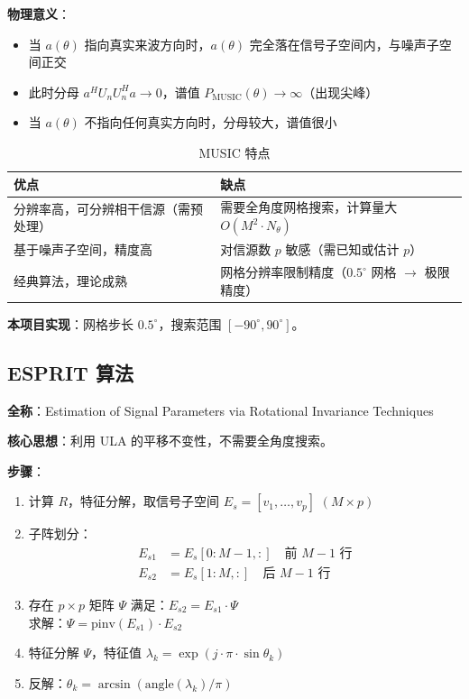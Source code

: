 \documentclass[11pt,a4paper]{article}
\begin{document}
\textbf{物理意义}：
\begin{itemize}
    \item 当 $a(\theta)$ 指向真实来波方向时，$a(\theta)$ 完全落在信号子空间内，与噪声子空间正交
    \item 此时分母 $a^H U_n U_n^H a \to 0$，谱值 $P_{\text{MUSIC}}(\theta) \to \infty$（出现尖峰）
    \item 当 $a(\theta)$ 不指向任何真实方向时，分母较大，谱值很小
\end{itemize}

\begin{table}[H]
\centering
\caption{MUSIC 特点}
\begin{tabular}{p{6cm}p{6cm}}
\toprule
\textbf{优点} & \textbf{缺点} \\
\midrule
分辨率高，可分辨相干信源（需预处理） & 需要全角度网格搜索，计算量大 $O(M^2 \cdot N_\theta)$ \\
基于噪声子空间，精度高 & 对信源数 $p$ 敏感（需已知或估计 $p$） \\
经典算法，理论成熟 & 网格分辨率限制精度（$0.5^\circ$ 网格 $\to$ 极限精度） \\
\bottomrule
\end{tabular}
\end{table}

\textbf{本项目实现}：网格步长 $0.5^\circ$，搜索范围 $[-90^\circ, 90^\circ]$。

\subsection{ESPRIT 算法}

\textbf{全称}：Estimation of Signal Parameters via Rotational Invariance Techniques

\textbf{核心思想}：利用 ULA 的平移不变性，不需要全角度搜索。

\textbf{步骤}：
\begin{enumerate}
    \item 计算 $R$，特征分解，取信号子空间 $E_s = [v_1, \ldots, v_p]$ \hfill $(M \times p)$
    \item 子阵划分：
    \begin{align}
    E_{s1} &= E_s[0:M-1, :] \quad \text{前 } M-1 \text{ 行} \\
    E_{s2} &= E_s[1:M, :] \quad \text{后 } M-1 \text{ 行}
    \end{align}
    \item 存在 $p \times p$ 矩阵 $\Psi$ 满足：$E_{s2} = E_{s1} \cdot \Psi$ \\
    求解：$\Psi = \text{pinv}(E_{s1}) \cdot E_{s2}$
    \item 特征分解 $\Psi$，特征值 $\lambda_k = \exp(j \cdot \pi \cdot \sin\theta_k)$
    \item 反解：$\theta_k = \arcsin(\text{angle}(\lambda_k) / \pi)$
\end{enumerate}
\end{document}
